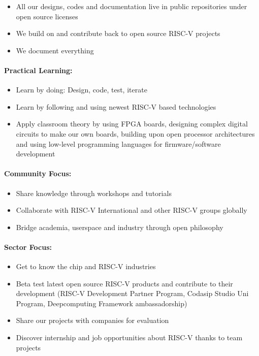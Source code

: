 \documentclass{article}
\begin{document}
\begin{itemize}
    \item All our designs, codes and documentation live in public repositories under open source licenses
    \item We build on and contribute back to open source RISC-V projects
    \item We document everything
\end{itemize}

\paragraph{Practical Learning:}

\begin{itemize}
    \item Learn by doing: Design, code, test, iterate
    \item Learn by following and using newest RISC-V based technologies
    \item Apply classroom theory by using FPGA boards, designing complex digital circuits to make our own boards, building upon open processor architectures and using low-level programming languages for firmware/software development
\end{itemize}

\paragraph{Community Focus:}

\begin{itemize}
    \item Share knowledge through workshops and tutorials
    \item Collaborate with RISC-V International and other RISC-V groups globally
    \item Bridge academia, userspace and industry through open philosophy
\end{itemize}

\paragraph{Sector Focus:}

\begin{itemize}
    \item Get to know the chip and RISC-V industries
    \item Beta test latest open source RISC-V products and contribute to their development (RISC-V Development Partner Program, Codasip Studio Uni Program, Deepcomputing Framework ambassadorship)
    \item Share our projects with companies for evaluation
    \item Discover internship and job opportunities about RISC-V thanks to team projects
\end{itemize}
\end{document}
